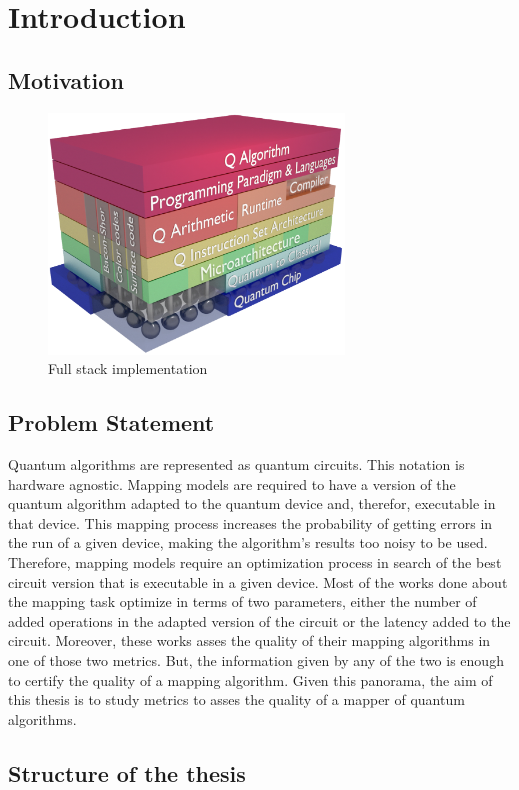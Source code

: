 
\chapter{Introduction}
\label{sec:org961b6e3}
\section{Motivation}
\label{sec:orgb5c1163}

\begin{figure}[htbp]
\centering
\includegraphics[width=0.7\textwidth]{figures/system_stack.png}
\caption{\label{fig:orgecea1a1}
Full stack implementation}
\end{figure}

\section{Problem Statement}
\label{sec:orgd35490c}

Quantum algorithms are represented as quantum circuits.
This notation is hardware agnostic.
Mapping models are required to have a version of the quantum algorithm adapted to the quantum device and, therefor, executable in that device.
This mapping process increases the probability of getting errors in the run of a given device, making the algorithm's results too noisy to be used.
Therefore, mapping models require an optimization process in search of the best circuit version that is executable in a given device.
Most of the works done about the mapping task optimize in terms of two parameters, either the number of added operations in the adapted version of the circuit or the latency added to the circuit.
Moreover, these works asses the quality of their mapping algorithms in one of those two metrics.
But, the information given by any of the two is enough to certify the quality of a mapping algorithm.
Given this panorama, the aim of this thesis is to study metrics to asses the quality of a mapper of quantum algorithms.

\section{Structure of the thesis}
\label{sec:org2a9c2ee}
